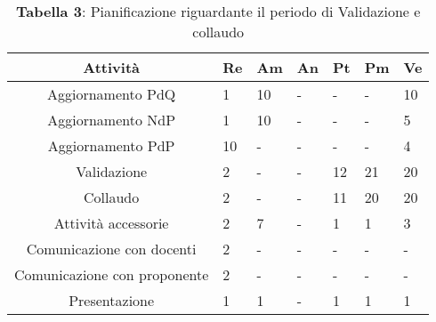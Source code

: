 \begin{table}[H]
	\centering
	\renewcommand{\arraystretch}{1.5}
	\begin{tabular}{|c|p{10mm}|p{10mm}|p{10mm}|p{10mm}|p{10mm}|p{10mm}|}
		\hline
		\rowcolor{lighter-grayer}
		Attività & Re & Am & An & Pt & Pm & Ve \\ \hline
		Aggiornamento PdQ          & 1  & 10 & - & - & - & 10 \\ \hline
		Aggiornamento NdP          & 1  & 10 & - & - & - & 5  \\ \hline
		Aggiornamento PdP          & 10 & - & - & - & - & 4  \\ \hline
		Validazione                & 2  & - & - & 12 & 21 & 20 \\ \hline
		Collaudo                   & 2  & - & - & 11 & 20 & 20 \\ \hline
		Attività accessorie 	   & 2  & 7  & - & 1  & 1  & 3  \\ \hline
		Comunicazione con docenti  & 2  & - & - & - & - & -   \\ \hline
		Comunicazione con proponente& 2  & - & - & - & - & -   \\ \hline
		Presentazione              & 1  & 1  & - & 1  & 1  & 1 \\
		\hline
	\end{tabular}
	\caption*{\textbf{Tabella 3}: Pianificazione riguardante il periodo di Validazione e collaudo\\}
\end{table}